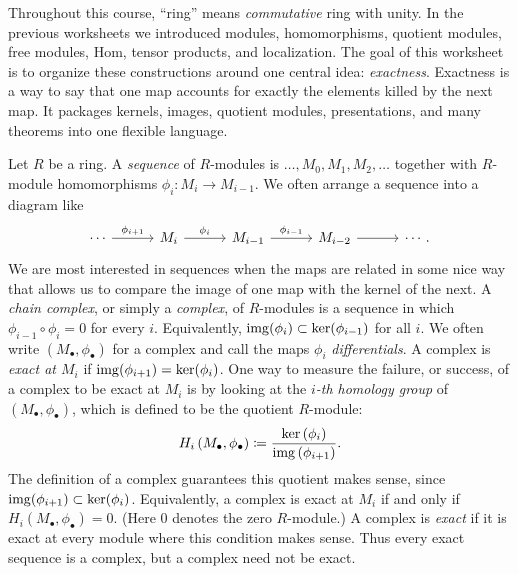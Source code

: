 \documentclass[Notebook.tex]{subfiles}
\begin{document}
\ifSubfilesClassLoaded{}{}



Throughout this course, ``ring'' means \textit{commutative} ring with unity. In the previous worksheets we introduced modules, homomorphisms, quotient modules, free modules, Hom, tensor products, and localization. The goal of this worksheet is to organize these constructions around one central idea: \emph{exactness}. Exactness is a way to say that one map accounts for exactly the elements killed by the next map. It packages kernels, images, quotient modules, presentations, and many theorems into one flexible language.

Let $R$ be a ring. A \emph{sequence} of $R$-modules is $\ldots,M_{0}, M_{1},M_{2},\ldots$ together with $R$-module homomorphisms $\phi_{i}:M_{i} \to M_{i-1}$. We often arrange a sequence into a diagram like\[
\begin{tikzcd}[row sep = .3em, column sep = 3em]
\cdots \arrow[r, "\phi_{i+1}"] & M_{i} \arrow[r, "\phi_{i}"] & M_{i-1} \arrow[r, "\phi_{i-1}"] & M_{i-2} \arrow[r] & \cdots.
\end{tikzcd}
\]
We are most interested in sequences when the maps are related in some nice way that allows us to compare the image of one map with the kernel of the next. A \emph{chain complex}, or simply a \emph{complex}, of $R$-modules is a sequence in which $\phi_{i-1}\circ \phi_{i}=0$ for every $i$. Equivalently, $\operatorname{img}(\phi_{i})\subset \ker(\phi_{i-1})$ for all $i$. We often write $(M_\bullet,\phi_\bullet)$ for a complex and call the maps $\phi_i$ \emph{differentials}. A complex is \emph{exact at $M_i$} if $\operatorname{img}(\phi_{i+1})=\ker(\phi_{i})$. One way to measure the failure, or success, of a complex to be exact at $M_{i}$ is by looking at the \emph{$i$-th homology group} of $(M_{\bullet},\phi_{\bullet})$, which is defined to be the quotient $R$-module:
\[
H_{i}\left(M_{\bullet}, \phi_{\bullet}\right) \coloneqq \frac{ \ker\left(\phi_{i}\right)}{\operatorname{img}\left(\phi_{i+1}\right)}.
\]
The definition of a complex guarantees this quotient makes sense, since $\operatorname{img}(\phi_{i+1}) \subset \ker(\phi_{i})$. Equivalently, a complex is exact at $M_i$ if and only if $H_i(M_\bullet,\phi_\bullet)=0$. (Here $0$ denotes the zero $R$-module.) A complex is \emph{exact} if it is exact at every module where this condition makes sense. Thus every exact sequence is a complex, but a complex need not be exact. 
\end{document}
